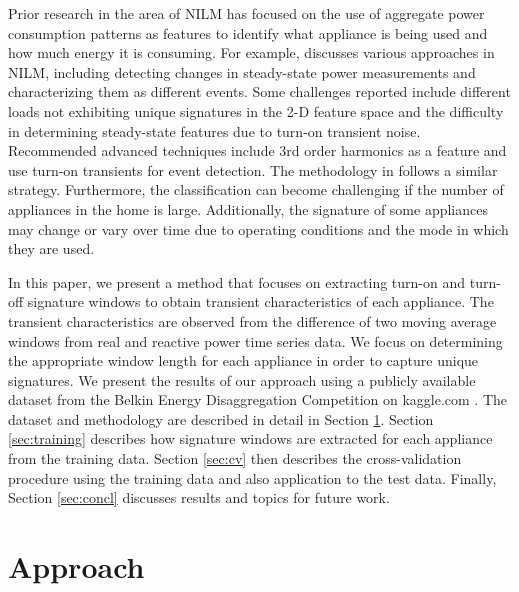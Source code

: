 \documentclass[conference]{IEEEtran}
\begin{document}
Prior research in the area of NILM has focused on the use of aggregate power consumption patterns as features to identify what appliance is being used and how much energy it is consuming. For example, \cite{mit} discusses various approaches in NILM, including detecting changes in steady-state power measurements and characterizing them as different events. Some challenges reported include different loads not exhibiting unique signatures in the 2-D feature space and the difficulty in determining steady-state features due to turn-on transient noise.  Recommended advanced techniques include 3rd order harmonics as a feature and use turn-on transients for event detection.  The methodology in \cite{adaptive, EMI, prob, Hart, Shaw, Lin, Wave} follows a similar strategy.  Furthermore, the classification can become challenging if the number of appliances in the home is large. Additionally, the signature of some appliances may change or vary over time due to operating conditions and the mode in which they are used. 

In this paper, we present a method that focuses on extracting turn-on and turn-off signature windows to obtain transient characteristics of each appliance.  The transient characteristics are observed from the difference of two moving average windows from real and reactive power time series data.  We focus on determining the appropriate window length for each appliance in order to capture unique signatures.  We present the results of our approach using a publicly available dataset from the Belkin Energy Disaggregation Competition on kaggle.com \cite{Kaggle}. The dataset and methodology are described in detail in Section \ref{sec:dataMethod}.  Section \ref{sec:training} describes how signature windows are extracted for each appliance from the training data. Section \ref{sec:cv} then describes the cross-validation procedure using the training data and also application to the test data. Finally, Section \ref{sec:concl} discusses results and topics for future work.


\section{Approach}\label{sec:dataMethod}
\end{document}
